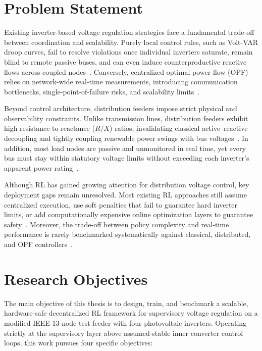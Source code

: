 \section{Problem Statement}
Existing inverter-based voltage regulation strategies face a fundamental trade-off between coordination and scalability. Purely local control rules, such as Volt-VAR droop curves, fail to resolve violations once individual inverters saturate, remain blind to remote passive buses, and can even induce counterproductive reactive flows across coupled nodes~\cite{Ortmann2020,Satsangi2022}. Conversely, centralized optimal power flow (OPF) relies on network-wide real-time measurements, introducing communication bottlenecks, single-point-of-failure risks, and scalability limits~\cite{Chen2022,Chan2026}.

Beyond control architecture, distribution feeders impose strict physical and observability constraints. Unlike transmission lines, distribution feeders exhibit high resistance-to-reactance ($R/X$) ratios, invalidating classical active--reactive decoupling and tightly coupling renewable power swings with bus voltages~\cite{Chen2022,Mughni2026}. In addition, most load nodes are passive and unmonitored in real time, yet every bus must stay within statutory voltage limits without exceeding each inverter's apparent power rating~\cite{Mughni2026}.

Although RL has gained growing attention for distribution voltage control, key deployment gaps remain unresolved. Most existing RL approaches still assume centralized execution, use soft penalties that fail to guarantee hard inverter limits, or add computationally expensive online optimization layers to guarantee safety~\cite{Chen2022,Chan2026}. Moreover, the trade-off between policy complexity and real-time performance is rarely benchmarked systematically against classical, distributed, and OPF controllers~\cite{Stradowski2023,Mughni2026}. 

\section{Research Objectives}
The main objective of this thesis is to design, train, and benchmark a scalable, hardware-safe decentralized RL framework for supervisory voltage regulation on a modified IEEE 13-node test feeder with four photovoltaic inverters. Operating strictly at the supervisory layer above assumed-stable inner converter control loops, this work pursues four specific objectives:

